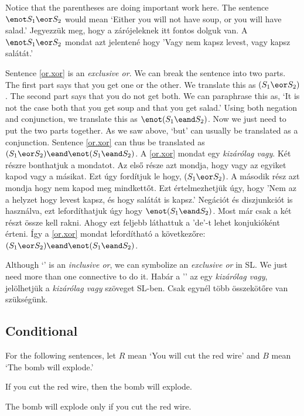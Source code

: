 Notice that the parentheses are doing important work here. The sentence $\enot S_1 \eor S_2$ would mean `Either you will not have soup, or you will have salad.'
Jegyezzük meg, hogy a zárójeleknek itt fontos dolguk van. A $\enot S_1 \eor S_2$ mondat azt jelentené hogy 'Vagy nem kapsz levest, vagy kapsz salátát.'

Sentence \ref{or.xor} is an \emph{exclusive or}. We can break the sentence into two parts. The first part says that you get one or the other. We translate this as $(S_1 \eor S_2)$. The second part says that you do not get both. We can paraphrase this as, `It is not the case both that you get soup and that you get salad.' Using both negation and conjunction, we translate this as $\enot(S_1 \eand S_2)$. Now we just need to put the two parts together. As we saw above, `but' can usually be translated as a conjunction. Sentence \ref{or.xor} can thus be translated as $(S_1 \eor S_2) \eand \enot(S_1 \eand S_2)$.
A \ref{or.xor} mondat egy \emph{kizárólag vagy}. Két részre bonthatjuk a mondatot. Az első része azt mondja, hogy vagy az egyiket kapod vagy a másikat. Ezt úgy fordítjuk le hogy, $(S_1 \eor S_2)$. A második rész azt mondja hogy nem kapod meg mindkettőt. Ezt értelmezhetjük úgy, hogy 'Nem az a helyzet hogy levest kapsz, és hogy salátát is kapsz.' Negációt és diszjunkciót is használva, ezt lefordíthatjuk úgy hogy $\enot(S_1 \eand S_2)$. Most már csak a két részt össze kell rakni. Ahogy ezt feljebb láthattuk a 'de'-t lehet konjukióként érteni. Így a \ref{or.xor} mondat lefordítható a következőre: $(S_1 \eor S_2) \eand \enot(S_1 \eand S_2)$.

Although `\eor' is an \emph{inclusive or}, we can symbolize an \emph{exclusive or} in {SL}. We just need more than one connective to do it.
Habár a '\eor' az egy \emph{kizárólag vagy}, jelölhetjük a \emph{kizárólag vagy} szöveget {SL}-ben. Csak egynél több összekötőre van szükségünk.


\subsection{Conditional}
For the following sentences, let $R$ mean `You will cut the red wire' and $B$ mean `The bomb will explode.'

\begin{earg}
\item[\ex{if1}] If you cut the red wire, then the bomb will explode.
\item[\ex{if2}] The bomb will explode only if you cut the red wire.
\end{earg}

